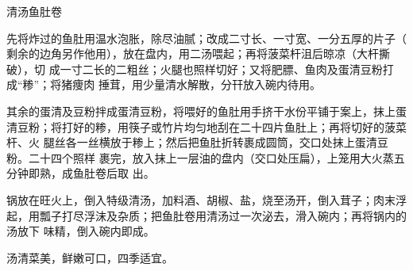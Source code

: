 \begin{recipe}{清汤鱼肚卷}

\ingredients


\preparation

\step 先将炸过的鱼肚用温水泡胀，除尽油腻；改成二寸长、一寸宽、一分五厚的片子（
剩余的边角另作他用），放在盘内，用二汤喂起；再将菠菜杆沮后晾凉（大杆撕破），切
成一寸二长的二粗丝；火腿也照样切好；又将肥膘、鱼肉及蛋清豆粉打成“糁”；将猪痩肉
捶茸，用少量清水解散，分幵放入碗内待用。

\step 其余的蛋清及豆粉拌成蛋清豆粉，将喂好的鱼肚用手挤干水份平铺于案上，抹上蛋
清豆粉；将打好的糁，用筷子或竹片均匀地刮在二十四片鱼肚上；再将切好的菠菜杆、火
腿丝各一丝横放于糁上；然后把鱼肚折转裹成圆筒，交口处抹上蛋清豆粉。二十四个照样
裹完，放入抹上一层油的盘内（交口处压扁），上笼用大火蒸五分钟即熟，成鱼肚卷后取
出。

\step 锅放在旺火上，倒入特级清汤，加料酒、胡椒、盐，烧至汤开，倒入茸子；肉末浮
起，用瓢子打尽浮沫及杂质；把鱼肚卷用清汤过一次泌去，滑入碗内；再将锅内的汤放下
味精，倒入碗内即成。

\features

汤清菜美，鲜嫩可口，四季适宜。

\end{recipe}

